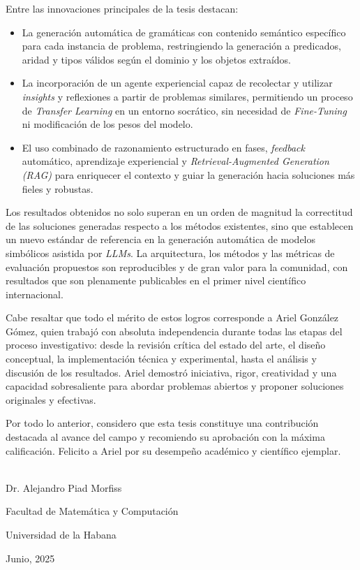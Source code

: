 \begin{opinion}
Entre las innovaciones principales de la tesis destacan:

\begin{itemize}
\item La generación automática de gramáticas con contenido semántico específico para cada instancia de problema, restringiendo la generación a predicados, aridad y tipos válidos según el dominio y los objetos extraídos.

\item La incorporación de un agente experiencial capaz de recolectar y utilizar \textit{insights} y reflexiones a partir de problemas similares, permitiendo un proceso de \textit{Transfer Learning} en un entorno socrático, sin necesidad de \textit{Fine-Tuning} ni modificación de los pesos del modelo.

\item El uso combinado de razonamiento estructurado en fases, \textit{feedback} automático, aprendizaje experiencial y \textit{Retrieval-Augmented Generation (RAG)} para enriquecer el contexto y guiar la generación hacia soluciones más fieles y robustas.
\end{itemize}

Los resultados obtenidos no solo superan en un orden de magnitud la correctitud de las soluciones generadas respecto a los métodos existentes, sino que establecen un nuevo estándar de referencia en la generación automática de modelos simbólicos asistida por \textit{LLMs}. La arquitectura, los métodos y las métricas de evaluación propuestos son reproducibles y de gran valor para la comunidad, con resultados que son plenamente publicables en el primer nivel científico internacional.

Cabe resaltar que todo el mérito de estos logros corresponde a Ariel González Gómez, quien trabajó con absoluta independencia durante todas las etapas del proceso investigativo: desde la revisión crítica del estado del arte, el diseño conceptual, la implementación técnica y experimental, hasta el análisis y discusión de los resultados. Ariel demostró iniciativa, rigor, creatividad y una capacidad sobresaliente para abordar problemas abiertos y proponer soluciones originales y efectivas.

Por todo lo anterior, considero que esta tesis constituye una contribución destacada al avance del campo y recomiendo su aprobación con la máxima calificación. Felicito a Ariel por su desempeño académico y científico ejemplar.

\vspace{0.5cm}

\begin{flushright}
	\underline{\hspace{6.5cm}}\\
	Dr. Alejandro Piad Morfiss
	
	Facultad de Matemática y Computación
	
	Universidad de la Habana
	
	Junio, 2025
\end{flushright}

\end{opinion}